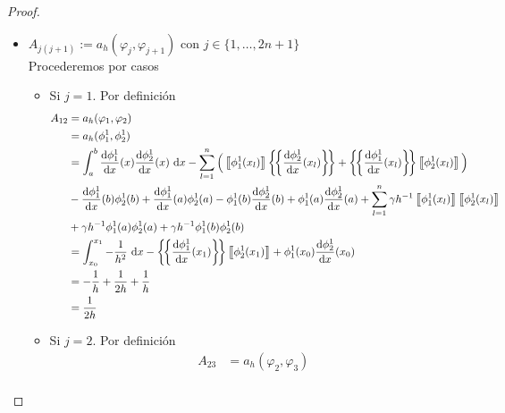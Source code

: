 \documentclass[10pt,a4paper]{report}
\newcommand{\dx}{\textup{d}x}
\providecommand{\Dx}[1]{\frac{\textup{d} #1}{\textup{d}x}}
\providecommand{\salto}[1]{\left\llbracket#1\right\rrbracket}
\providecommand{\prom}[1]{\left \{\!\left \{#1\right \}\!\right \}}
\begin{document}
\begin{proof}
\begin{itemize}
\begin{itemize}
\begin{align*}
        			&+ \gamma h^{-1}\phi^{i}_{1}(a)\phi^{i}_{1}(a) + \gamma h^{-1}\phi^{i}_{1}(b)\phi^{i}_{1}(b)\\
        			&= \int_{x_{i-1}}^{x_{i}}\frac{1}{h^{2}}\ \dx - 2\salto{\phi^{i}_{1}(x_{i-1})}\prom{\Dx{\phi^{i}_{1}}(x_{i-1})} + \gamma h^{-1}\salto{\phi^{i}_{1}(x_{i-1})}\\
        			&= \frac{1}{h} - \frac{1}{h} + \frac{\gamma}{h}\\
        			&= \frac{\gamma}{h}
        		\end{align*}
        	\end{itemize}
            \newpage
            \item  $A_{j(j+1)} := a_{h}\left( \varphi_{j},\varphi_{j+1}\right)$ con $j\in\{1,\dots,2n+1\}$\\
        Procederemos por casos
            \begin{itemize}
            	\item Si $j=1$. Por definición
            	\begin{align*}
            		A_{12} &= a_{h}(\varphi_{1},\varphi_{2})\\ 
            		       &= a_{h}(\phi^{1}_{1},\phi^{1}_{2})\\
            		       &= \int_{a}^{b} \Dx{\phi^{1}_{1}}(x)\Dx{\phi^{1}_{2}}(x)\ \dx - \sum_{l=1}^{n}\Big(\salto{\phi^{1}_{1}(x_{l})}\prom{\Dx{\phi^{1}_{2}}(x_{l})} + \prom{\Dx{\phi^{1}_{1}}(x_{l})}\salto{\phi^{1}_{2}(x_{l})}\Big)\\
            		       &-\Dx{\phi^{1}_{1}}(b)\phi^{1}_{2}(b) + \Dx{\phi^{1}_{1}}(a)\phi^{1}_{2}(a) - \phi^{1}_{1}(b)\Dx{\phi^{1}_{2}}(b) + \phi^{1}_{1}(a)\Dx{\phi^{1}_{2}}(a) + \sum_{l=1}^{n}\gamma h^{-1}\salto{\phi^{1}_{1}(x_{l})}\salto{\phi^{1}_{2}(x_{l})}\\
            		       &+ \gamma h^{-1}\phi^{1}_{1}(a)\phi^{1}_{2}(a) + \gamma h^{-1}\phi^{1}_{1}(b)\phi^{1}_{2}(b)\\
            		       &= \int_{x_{0}}^{x_{1}} -\frac{1}{h^{2}}\ \dx -\prom{\Dx{\phi^{1}_{1}}(x_{1})}\salto{\phi^{1}_{2}(x_{1})} + \phi^{1}_{1}(x_{0})\Dx{\phi^{1}_{2}}(x_{0}) \\
            		       &= -\frac{1}{h} + \frac{1}{2h} + \frac{1}{h}\\
            		       &= \frac{1}{2h}
            	\end{align*}
                \item Si $j=2$. Por definición
                \begin{align*}
                	A_{23} &= a_{h}(\varphi_{2},\varphi_{3})\\ 

\end{align*}
\end{itemize}
\end{itemize}
\end{proof}
\end{document}
